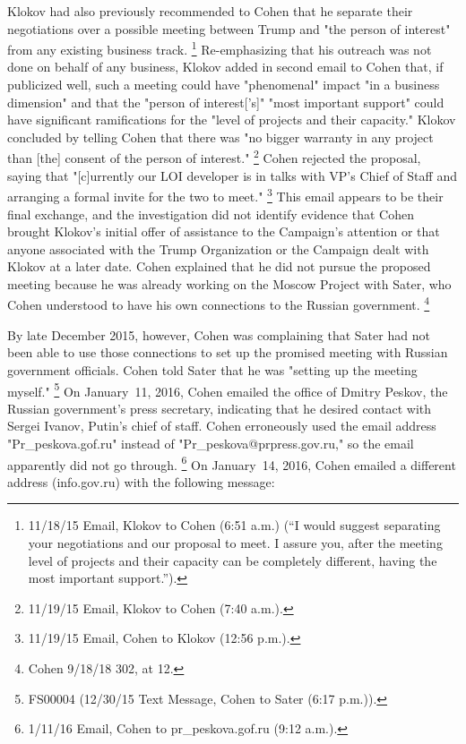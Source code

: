 Klokov had also previously recommended to Cohen that he separate their negotiations over a possible meeting between Trump and "the person of interest" from any existing business track.%
\footnote{11/18/15 Email, Klokov to Cohen (6:51 a.m.) (“I would suggest separating your negotiations and our proposal to meet.
I assure you, after the meeting level of projects and their capacity can be completely different, having the most important support.”).}
Re-emphasizing that his outreach was not done on behalf of any business, Klokov added in second email to Cohen that, if publicized well, such a meeting could have "phenomenal" impact "in a business dimension" and that the "person of interest['s]" "most important support" could have significant ramifications for the "level of projects and their capacity."
Klokov concluded by telling Cohen that there was "no bigger warranty in any project than [the] consent of the person of interest."%
\footnote{11/19/15 Email, Klokov to Cohen (7:40 a.m.).}
Cohen rejected the proposal, saying that "[c]urrently our LOI developer is in talks with VP's Chief of Staff and arranging a formal invite for the two to meet."%
\footnote{11/19/15 Email, Cohen to Klokov (12:56 p.m.).}
This email appears to be their final exchange, and the investigation did not identify evidence that Cohen brought Klokov's initial offer of assistance to the Campaign's attention or that anyone associated with the Trump Organization or the Campaign dealt with Klokov at a later date.
Cohen explained that he did not pursue the proposed meeting because he was already working on the Moscow Project with Sater, who Cohen understood to have his own connections to the Russian government.%
\footnote{Cohen 9/18/18 302, at 12.}

By late December 2015, however, Cohen was complaining that Sater had not been able to use those connections to set up the promised meeting with Russian government officials.
Cohen told Sater that he was "setting up the meeting myself."%
\footnote{FS00004 (12/30/15 Text Message, Cohen to Sater (6:17 p.m.)).}
On January~11, 2016, Cohen emailed the office of Dmitry Peskov, the Russian government's press secretary, indicating that he desired contact with Sergei Ivanov, Putin's chief of staff.
Cohen erroneously used the email address "Pr\_peskova\@prpress.gof.ru" instead of "Pr\_peskova@prpress.gov.ru," so the email apparently did not go through.%
\footnote{1/11/16 Email, Cohen to pr\_peskova\@prpress.gof.ru (9:12 a.m.).}
On January~14, 2016, Cohen emailed a different address (info\@prpress.gov.ru) with the following message:

